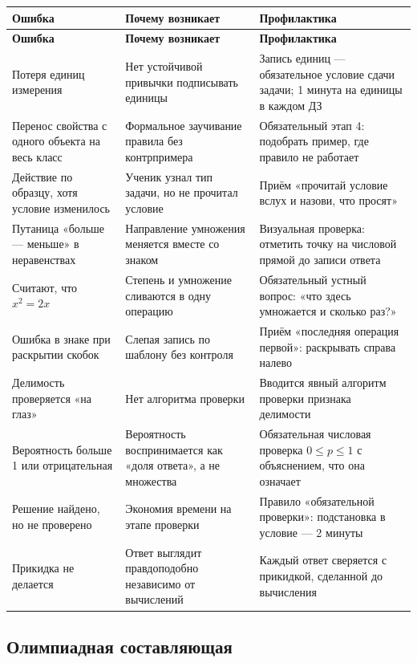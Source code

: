 \documentclass[12pt,a4paper]{article}
\begin{document}
\begin{longtable}{L{4.6cm}L{4.6cm}L{5.0cm}}
\toprule
\textbf{Ошибка} & \textbf{Почему возникает} & \textbf{Профилактика}\\
\midrule
\endfirsthead

\toprule
\textbf{Ошибка} & \textbf{Почему возникает} & \textbf{Профилактика}\\
\midrule
\endhead

Потеря единиц измерения & Нет устойчивой привычки
подписывать единицы & Запись единиц --- обязательное условие
сдачи задачи; 1 минута на единицы в каждом ДЗ\\
\addlinespace
Перенос свойства с одного объекта на весь класс & Формальное
заучивание правила без контрпримера & Обязательный этап 4:
подобрать пример, где правило не работает\\
\addlinespace
Действие по образцу, хотя условие изменилось & Ученик
узнал тип задачи, но не прочитал условие & Приём «прочитай
условие вслух и назови, что просят»\\
\addlinespace
Путаница «больше --- меньше» в неравенствах & Направление
умножения меняется вместе со знаком & Визуальная проверка:
отметить точку на числовой прямой до записи ответа\\
\addlinespace
Считают, что $x^2 = 2x$ & Степень и умножение сливаются
в одну операцию & Обязательный устный вопрос: «что здесь
умножается и сколько раз?»\\
\addlinespace
Ошибка в знаке при раскрытии скобок & Слепая запись по шаблону
без контроля & Приём «последняя операция первой»:
раскрывать справа налево\\
\addlinespace
Делимость проверяется «на глаз» & Нет алгоритма проверки &
Вводится явный алгоритм проверки признака делимости\\
\addlinespace
Вероятность больше 1 или отрицательная & Вероятность
воспринимается как «доля ответа», а не множества &
Обязательная числовая проверка $0 \leq p \leq 1$
с объяснением, что она означает\\
\addlinespace
Решение найдено, но не проверено & Экономия времени
на этапе проверки & Правило «обязательной проверки»:
подстановка в условие — 2 минуты\\
\addlinespace
Прикидка не делается & Ответ выглядит правдоподобно
независимо от вычислений & Каждый ответ сверяется
с прикидкой, сделанной до вычисления\\
\bottomrule
\end{longtable}

\subsection{Олимпиадная составляющая}
\end{document}
